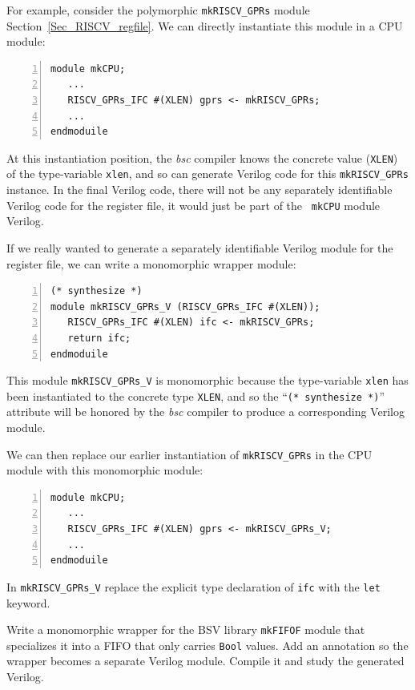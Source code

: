 For example, consider the polymorphic {\tt mkRISCV\_GPRs} module
Section~\ref{Sec_RISCV_regfile}.  We can directly instantiate this
module in a CPU module:

{\small
\begin{Verbatim}[frame=single, numbers=left]
module mkCPU;
   ...
   RISCV_GPRs_IFC #(XLEN) gprs <- mkRISCV_GPRs;
   ...
endmoduile
\end{Verbatim}
}

At this instantiation position, the \emph{bsc} compiler knows the
concrete value ({\tt XLEN}) of the type-variable {\tt xlen}, and so
can generate Verilog code for this {\tt mkRISCV\_GPRs} instance.  In
the final Verilog code, there will not be any separately identifiable
Verilog code for the register file, it would just be part of the {\tt
mkCPU} module Verilog.

If we really wanted to generate a separately identifiable Verilog
module for the register file, we can write a monomorphic wrapper
module:

{\small
\begin{Verbatim}[frame=single, numbers=left]
(* synthesize *)
module mkRISCV_GPRs_V (RISCV_GPRs_IFC #(XLEN));
   RISCV_GPRs_IFC #(XLEN) ifc <- mkRISCV_GPRs;
   return ifc;
endmoduile
\end{Verbatim}
}

This module {\tt mkRISCV\_GPRs\_V} is monomorphic because the
type-variable {\tt xlen} has been instantiated to the concrete type
{\tt XLEN}, and so the ``{\tt (* synthesize *)}'' attribute will be
honored by the \emph{bsc} compiler to produce a corresponding Verilog
module.

We can then replace our earlier instantiation of {\tt mkRISCV\_GPRs}
in the CPU module with this monomorphic module:

{\small
\begin{Verbatim}[frame=single, numbers=left]
module mkCPU;
   ...
   RISCV_GPRs_IFC #(XLEN) gprs <- mkRISCV_GPRs_V;
   ...
endmoduile
\end{Verbatim}
}

\hdivider

\Exercise

\hm In {\tt mkRISCV\_GPRs\_V} replace the explicit type declaration
of {\tt ifc} with the {\tt let} keyword.

\Exercise

\hm Write a monomorphic wrapper for the BSV library {\tt mkFIFOF}
module that specializes it into a FIFO that only carries {\tt Bool}
values.  Add an annotation so the wrapper becomes a separate Verilog
module.  Compile it and study the generated Verilog.

\Endexercise

